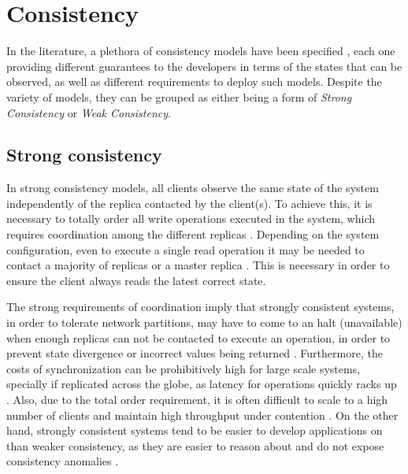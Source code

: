 \section{Consistency}
\label{sec:consistency}

In the literature, a plethora of consistency models have been specified \cite{linearizability, si, spanner, understandingEC, cops, dynamo, cassandra}, each one providing different guarantees to the developers in terms of the states that can be observed, as well as different requirements to deploy such models.
Despite the variety of models, they can be grouped as either being a form of \emph{Strong Consistency} or \emph{Weak Consistency}.

\subsection{Strong consistency}
\label{subsec:strong}

In strong consistency models, all clients observe the same state of the system independently of the replica contacted by the client(s).
To achieve this, it is necessary to totally order all write operations executed in the system, which requires coordination among the different replicas \cite{linearizability,spanner,caerus,mdcc,detock,chainreaction}.
Depending on the system configuration, even to execute a single read operation it may be needed to contact a majority of replicas or a master replica \cite{spanner,slog}.
This is necessary in order to ensure the client always reads the latest correct state.

The strong requirements of coordination imply that strongly consistent systems, in order to tolerate network partitions, may have to come to an halt (unavailable) when enough replicas can not be contacted to execute an operation, in order to prevent state divergence or incorrect values being returned \cite{sconekv,cure,chainreaction,dynamo}.
Furthermore, the costs of synchronization can be prohibitively high for large scale systems, specially if replicated across the globe, as latency for operations quickly racks up \cite{caerus,mdcc,detock}.
Also, due to the total order requirement, it is often difficult to scale to a high number of clients and maintain high throughput under contention \cite{bargain,dynamo}.
On the other hand, strongly consistent systems tend to be easier to develop applications on than weaker consistency, as they are easier to reason about and do not expose consistency anomalies \cite{spanner,sconekv,slog,chainreaction,dynamo}.

